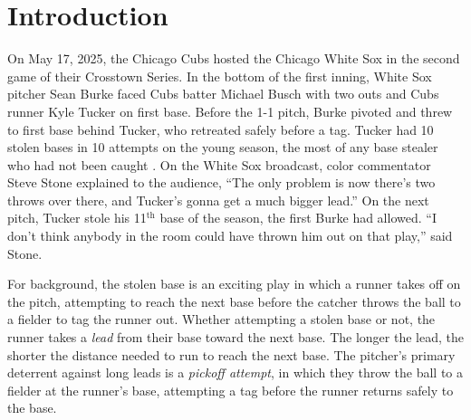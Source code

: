 \documentclass[aoas]{imsart}
\begin{document}
\begin{frontmatter}
\begin{keyword}
\end{keyword}

\end{frontmatter}



  
 \section{Introduction}
  \label{sec:introduction}
    On May 17, 2025, the Chicago Cubs hosted the Chicago White Sox in the second game of their Crosstown Series. In the bottom of the first inning, White Sox pitcher Sean Burke faced Cubs batter Michael Busch with two outs and Cubs runner Kyle Tucker on first base. Before the 1-1 pitch, Burke pivoted and threw to first base behind Tucker, who retreated safely before a tag. Tucker had 10 stolen bases in 10 attempts on the young season, the most of any base stealer who had not been caught \citep{fangraphs_major_2025}. On the White Sox broadcast, color commentator Steve Stone explained to the audience, ``The only problem is now there's two throws over there, and Tucker's gonna get a much bigger lead.'' On the next pitch, Tucker stole his 11$^\text{th}$ base of the season, the first Burke had allowed. ``I don't think anybody in the room could have thrown him out on that play,'' said Stone.

    For background, the stolen base is an exciting play in which a runner takes off on the pitch, attempting to reach the next base before the catcher throws the ball to a fielder to tag the runner out. Whether attempting a stolen base or not, the runner takes a {\it lead} from their base toward the next base. The longer the lead, the shorter the distance needed to run to reach the next base. The pitcher's primary deterrent against long leads is a {\it pickoff attempt}, in which they throw the ball to a fielder at the runner's base, attempting a tag before the runner returns safely to the base.
\end{document}
